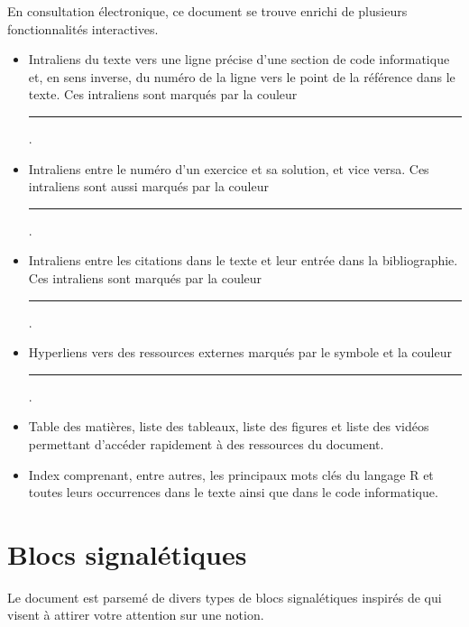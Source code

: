 En consultation électronique, ce document se trouve enrichi de
plusieurs fonctionnalités interactives.
\begin{itemize}
\item Intraliens du texte vers une ligne précise d'une section de code
  informatique et, en sens inverse, du numéro de la ligne vers le
  point de la référence dans le texte. Ces intraliens sont marqués par
  la couleur \textcolor{link}{\rule{1.5em}{1.2ex}}.
\item Intraliens entre le numéro d'un exercice et sa solution, et vice
  versa. Ces intraliens sont aussi marqués par la couleur
  \textcolor{link}{\rule{1.5em}{1.2ex}}.
\item Intraliens entre les citations dans le texte et leur entrée dans
  la bibliographie. Ces intraliens sont marqués par la couleur
  \textcolor{citation}{\rule{1.5em}{1.2ex}}.
\item Hyperliens vers des ressources externes marqués par le symbole
  {\smaller\faExternalLink} et la couleur
  \textcolor{url}{\rule{1.5em}{1.2ex}}.
\item Table des matières, liste des tableaux, liste des figures et
  liste des vidéos permettant d'accéder rapidement à des ressources du
  document.
\item Index comprenant, entre autres, les principaux mots clés du
  langage R et toutes leurs occurrences dans le texte ainsi que
  dans le code informatique.
\end{itemize}

\section*{Blocs signalétiques}

Le document est parsemé de divers types de blocs signalétiques
inspirés de
qui visent à attirer votre attention sur une notion.

\vspace{-\baselineskip}

\vspace{-\baselineskip}

\vspace{-\baselineskip}

